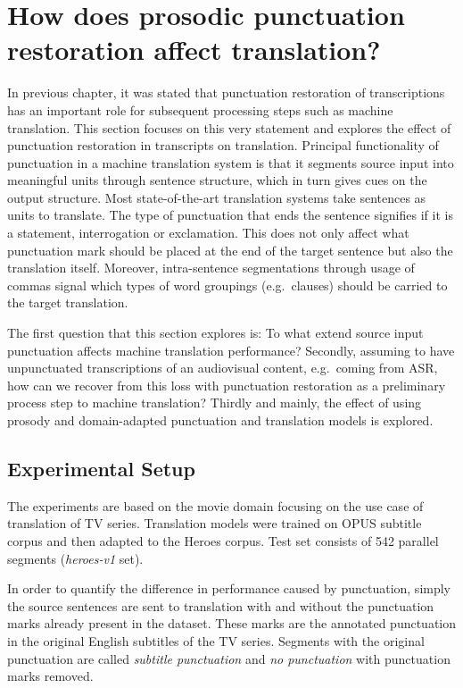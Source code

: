 \section{How does prosodic punctuation restoration affect translation?}
\label{transProse:Q1}

In previous chapter, it was stated that punctuation restoration of transcriptions has an important role for subsequent processing steps such as machine translation. This section focuses on this very statement and explores the effect of punctuation restoration in transcripts on translation. Principal functionality of punctuation in a machine translation system is that it segments source input into meaningful units through sentence structure, which in turn gives cues on the output structure. Most state-of-the-art translation systems take sentences as units to translate. The type of punctuation that ends the sentence signifies if it is a statement, interrogation or exclamation. This does not only affect what punctuation mark should be placed at the end of the target sentence but also the translation itself. Moreover, intra-sentence segmentations through usage of commas signal which types of word groupings (e.g.~clauses) should be carried to the target translation.

The first question that this section explores is: To what extend source input punctuation affects machine translation performance? Secondly, assuming to have unpunctuated transcriptions of an audiovisual content, e.g.~coming from ASR, how can we recover from this loss with punctuation restoration as a preliminary process step to machine translation? Thirdly and mainly, the effect of using prosody and domain-adapted punctuation and translation models is explored. 

\subsection*{Experimental Setup}

The experiments are based on the movie domain focusing on the use case of translation of TV series. Translation models were trained on OPUS subtitle corpus and then adapted to the Heroes corpus. Test set consists of 542 parallel segments (\textit{heroes-v1} set). 

In order to quantify the difference in performance caused by punctuation, simply the source sentences are sent to translation with and without the punctuation marks already present in the dataset. These marks are the annotated punctuation in the original English subtitles of the TV series. Segments with the original punctuation are called \textit{subtitle punctuation} and \textit{no punctuation} with punctuation marks removed. 

